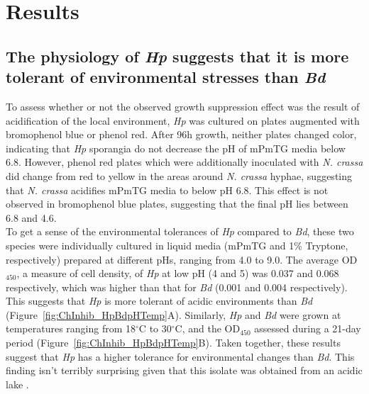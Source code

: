 \section{Results}
\subsection*{The physiology of \textit{Hp} suggests that it is more tolerant of environmental stresses than \textit{Bd}}
To assess whether or not the observed growth suppression effect was the result of acidification of the local environment, \textit{Hp} was cultured on plates augmented with bromophenol blue or phenol red. After 96h growth, neither plates changed color, indicating that \textit{Hp} sporangia do not decrease the pH of mPmTG media below 6.8. However, phenol red plates which were additionally inoculated with \textit{N. crassa} did change from red to yellow in the areas around \textit{N. crassa} hyphae, suggesting that \textit{N. crassa} acidifies mPmTG media to below pH 6.8. This effect is not observed in bromophenol blue plates, suggesting that the final pH lies between 6.8 and 4.6.\\
\indent To get a sense of the environmental tolerances of \textit{Hp} compared to \textit{Bd}, these two species were individually cultured in liquid media (mPmTG and 1\% Tryptone, respectively) prepared at different pHs, ranging from 4.0 to 9.0. The average OD$_{450}$, a measure of cell density, of \textit{Hp} at low pH (4 and 5) was 0.037 and 0.068 respectively, which was higher than that for \textit{Bd} (0.001 and 0.004 respectively). This suggests that \textit{Hp} is more tolerant of acidic environments than \textit{Bd} (Figure~\ref{fig:ChInhib_HpBdpHTemp}A). Similarly, \textit{Hp} and \textit{Bd} were grown at temperatures ranging from 18$^{\circ}$C to 30$^{\circ}$C, and the OD$_{450}$ assessed during a 21-day period (Figure~\ref{fig:ChInhib_HpBdpHTemp}B). Taken together, these results suggest that \textit{Hp} has a higher tolerance for environmental changes than \textit{Bd}. This finding isn’t terribly surprising given that this isolate was obtained from an acidic lake \cite{Longcore2011}.\\
